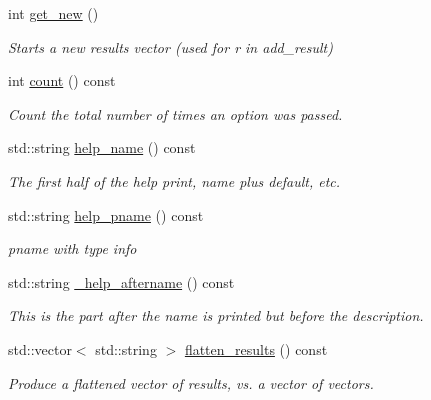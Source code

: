 \begin{DoxyCompactItemize}
\mbox{\label{class_c_l_i_1_1_option_a72c906e471759afcbcf52e04288e44ab}} 
int \hyperlink{class_c_l_i_1_1_option_a72c906e471759afcbcf52e04288e44ab}{get\+\_\+new} ()
\begin{DoxyCompactList}\small\item\em Starts a new results vector (used for r in add\+\_\+result) \end{DoxyCompactList}\item 
\mbox{\label{class_c_l_i_1_1_option_ac1f93311a6577359953e54a2e575ae71}} 
int \hyperlink{class_c_l_i_1_1_option_ac1f93311a6577359953e54a2e575ae71}{count} () const
\begin{DoxyCompactList}\small\item\em Count the total number of times an option was passed. \end{DoxyCompactList}\item 
\mbox{\label{class_c_l_i_1_1_option_a04678f59beb4efd6f6641f7684410521}} 
std\+::string \hyperlink{class_c_l_i_1_1_option_a04678f59beb4efd6f6641f7684410521}{help\+\_\+name} () const
\begin{DoxyCompactList}\small\item\em The first half of the help print, name plus default, etc. \end{DoxyCompactList}\item 
\mbox{\label{class_c_l_i_1_1_option_adc163181d02633344838b04191624306}} 
std\+::string \hyperlink{class_c_l_i_1_1_option_adc163181d02633344838b04191624306}{help\+\_\+pname} () const
\begin{DoxyCompactList}\small\item\em pname with type info \end{DoxyCompactList}\item 
\mbox{\label{class_c_l_i_1_1_option_a29b64a9a6ed7bbc5966801b221018aa9}} 
std\+::string \hyperlink{class_c_l_i_1_1_option_a29b64a9a6ed7bbc5966801b221018aa9}{\+\_\+help\+\_\+aftername} () const
\begin{DoxyCompactList}\small\item\em This is the part after the name is printed but before the description. \end{DoxyCompactList}\item 
\mbox{\label{class_c_l_i_1_1_option_abf59d86491287a29f76aead3818a2770}} 
std\+::vector$<$ std\+::string $>$ \hyperlink{class_c_l_i_1_1_option_abf59d86491287a29f76aead3818a2770}{flatten\+\_\+results} () const
\begin{DoxyCompactList}\small\item\em Produce a flattened vector of results, vs. a vector of vectors. \end{DoxyCompactList}\end{DoxyCompactItemize}
